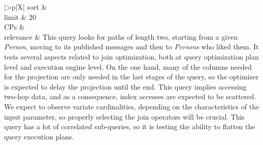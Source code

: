 \begin{tabularx}{\queryCardWidth}{|>{\queryPropertyCell}p{\queryPropertyCellWidth}|X|}
		sort		&
		\innerCardVSpace \\ \hline
	limit & 20 \\ \hline
	CPs &
	 \\ \hline
	relevance &
		\footnotesize This query looks for paths of length two, starting from a given
\emph{Person}, moving to its published messages and then to
\emph{Persons} who liked them. It tests several aspects related to join
optimization, both at query optimization plan level and execution engine
level. On the one hand, many of the columns needed for the projection
are only needed in the last stages of the query, so the optimizer is
expected to delay the projection until the end. This query implies
accessing two-hop data, and as a consequence, index accesses are
expected to be scattered. We expect to observe variate cardinalities,
depending on the characteristics of the input parameter, so properly
selecting the join operators will be crucial. This query has a lot of
correlated sub-queries, so it is testing the ability to flatten the
query execution plans.
 \\ \hline%
\end{tabularx}
\queryCardVSpace

\let\emph\oldemph